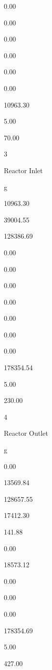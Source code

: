 \documentclass[a4paper,portrait,12pt]{article}
\begin{document}
0.00


0.00


0.00


0.00


0.00


0.00


10963.30


5.00


70.00





3


\begin{flushleft}
Reactor Inlet
\end{flushleft}


\begin{flushleft}
g
\end{flushleft}


10963.30


39004.55


128386.69


0.00


0.00


0.00


0.00


0.00


0.00


0.00


178354.54


5.00


230.00





4


\begin{flushleft}
Reactor Outlet
\end{flushleft}


\begin{flushleft}
g
\end{flushleft}


0.00


13569.84


128657.55


17412.30


141.88


0.00


18573.12


0.00


0.00


0.00


178354.69


5.00


427.00
\end{document}
